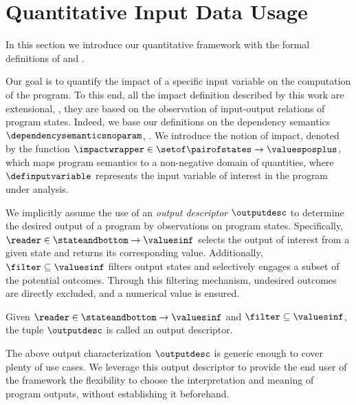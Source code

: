 \section{Quantitative Input Data Usage}
\newcommand*{\x}{\texttt{angle}}
\newcommand*{\y}{\texttt{speed}}
\newcommand*{\z}{\texttt{risk}}
\newcommand*{\lc}{\texttt{landing\_coeff}}

In this section we introduce our quantitative framework with the formal definitions of \rangename{} and \outcomesname.


Our goal is to quantify the impact of a specific input variable on the computation of the program.
To this end, all the impact definition described by this work are extensional, \ie, they are based on the observation of input-output relations of program states.
Indeed, we base our definitions on the dependency semantics $\dependencysemanticsnoparam$, .
We introduce the notion of impact, denoted by the function $\impactwrapper\in\setof\pairofstates\to\valuesposplus$, which maps program semantics to a non-negative domain of quantities, where $\definputvariable$ represents the input variable of interest in the program under analysis.

We implicitly assume the use of an \textit{output descriptor} $\outputdesc$ to determine the desired output of a program by observations on program states.
%
Specifically, $\reader\in \stateandbottom \to \valuesinf$ selects the output of interest from a given state and returns its corresponding value.
Additionally, $\filter\subseteq\valuesinf$ filters output states and selectively engages a subset of the potential outcomes.
Through this filtering mechanism, undesired outcomes are directly excluded, and a numerical value is ensured.

\begin{definition}
  Given $\reader\in\stateandbottom\to\valuesinf$ and $\filter\subseteq\valuesinf$, the tuple $\outputdesc$ is called an \textup{output descriptor}.
\end{definition}

The above output characterization $\outputdesc$ is generic enough to cover plenty of use cases.
We leverage this output descriptor to provide the end user of the framework the flexibility to choose the interpretation and meaning of program outputs, without establishing it beforehand.

